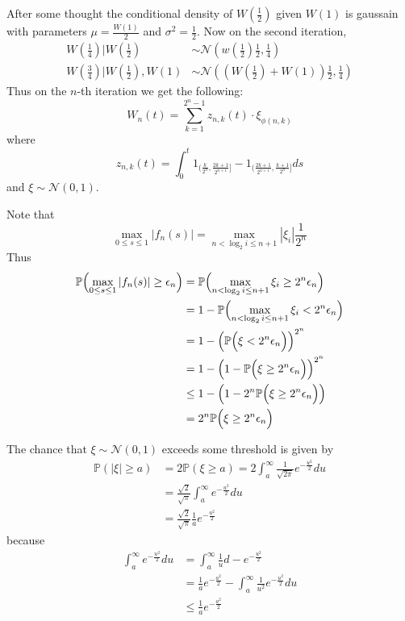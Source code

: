 \documentclass[a4paper]{article}
\newcommand{\Ncal}{\mathcal{N}}
\newcommand{\pr}{\mathbb{P}}
\begin{document}
After some thought the conditional density of $W(\frac{1}{2})$ given $W(1)$ is gaussain
with parameters $\mu = \frac{W(1)}{2}$ and $\sigma^2 = \frac{1}{2}$.
Now on the second iteration,
\begin{align*}
	W(\frac{1}{4})|W(\frac{1}{2}) &\sim \Ncal(w(\frac{1}{2})\frac{1}{2}, \frac{1}{4})\\
	W(\frac{3}{4})|W(\frac{1}{2}),W(1) &\sim \Ncal((W(\frac{1}{2})+W(1))\frac{1}{2}, \frac{1}{4})
\end{align*}
Thus on the $n$-th iteration we get the following:
\[
W_n(t) = \sum_{k=1}^{2^n-1} z_{n,k}(t) \cdot \xi_{\phi(n,k)}
\]
where 
\[
z_{n,k}(t) = \int_0^t 1_{( \frac{k}{2^n}, \frac{2k+1}{2^{n+1}} ]} - 1_{( \frac{2k+1}{2^{n+1}}, \frac{k+1}{2^n} ]} ds
\]
and $\xi\sim\Ncal(0,1)$.

Note that 
\[
\max_{0\leq s\leq 1} |f_n(s)| = \max_{n<\log_2 i \leq n+1} |\xi_i| \frac{1}{2^n}
\]
Thus
\begin{align*}
	\pr\Bigl( \max_{0\leq s\leq 1} |f_n(s)| \geq \epsilon_n \Bigr)
	&= \pr\Bigl( \max_{n<\log_2 i \leq n+1} \xi_i \geq 2^n \epsilon_n \Bigr)\\
	&= 1 - \pr\Bigl( \max_{n<\log_2 i \leq n+1} \xi_i < 2^n \epsilon_n \Bigr)\\
	&= 1 - \Bigl( \pr\Bigl( \xi < 2^n \epsilon_n \Bigr)\Bigr)^{2^n}\\
	&= 1 - \Bigl( 1 - \pr\Bigl( \xi \geq 2^n \epsilon_n \Bigr)\Bigr)^{2^n}\\
	&\leq 1 - \Bigl( 1 - 2^n \pr\Bigl( \xi \geq 2^n \epsilon_n \Bigr)\Bigr)\\
	&= 2^n \pr\Bigl( \xi \geq 2^n \epsilon_n \Bigr)
\end{align*}

The chance that $\xi\sim\Ncal(0,1)$ exceeds some threshold is given by
\begin{align*}
	\pr(|\xi| \geq a)
	&= 2 \pr(\xi \geq a )
	= 2 \int_a^\infty  \frac{1}{\sqrt{2\pi}} e^{-\frac{u^2}{2}} du\\
	&= \frac{\sqrt{2}}{\sqrt{\pi}} \int_a^\infty e^{-\frac{u^2}{2}} du\\
	&= \frac{\sqrt{2}}{\sqrt{\pi}} \frac{1}{a} e^{-\frac{a^2}{2}}
\end{align*}
because
\begin{align*}
\int_a^\infty e^{-\frac{u^2}{2}} du
&= \int_a^\infty \frac{1}{u} d -e^{-\frac{u^2}{2}}\\
&= \frac{1}{a} e^{-\frac{a^2}{2}} - \int_a^\infty \frac{1}{u^2} e^{-\frac{u^2}{2}} du\\
&\leq \frac{1}{a} e^{-\frac{a^2}{2}}
\end{align*}
\end{document}
